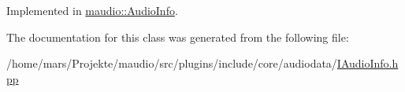 Implemented in \hyperlink{classmaudio_1_1AudioInfo_aa75d37ecf53cca3a0b7cecfb004da207}{maudio\-::\-Audio\-Info}.



The documentation for this class was generated from the following file\-:\begin{DoxyCompactItemize}
\item 
/home/mars/\-Projekte/maudio/src/plugins/include/core/audiodata/\hyperlink{IAudioInfo_8hpp}{I\-Audio\-Info.\-hpp}\end{DoxyCompactItemize}

